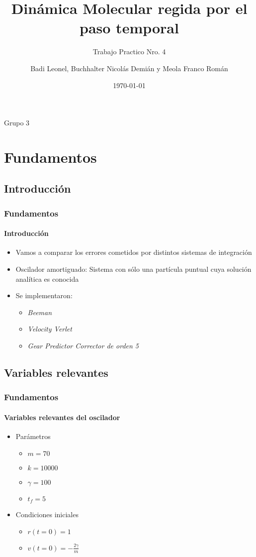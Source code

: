 \documentclass[hyperref={pdfpagelayout=SinglePage}]{beamer}
\title{Dinámica Molecular regida por el paso temporal}
\subtitle{Trabajo Practico Nro. 4}
\author{Badi Leonel, Buchhalter Nicolás Demián y Meola Franco Román}
\date{\today}
\begin{document}
\renewcommand{\figurename}{Grafico}

\begin{frame}[plain]
    \frametitle{} 
    \titlepage
    \centering
	Grupo 3
\end{frame}

\section{Fundamentos}

\subsection{Introducción}

\begin{frame}
\frametitle{Fundamentos}
\framesubtitle{Introducción}
\begin{itemize}
	\item Vamos a comparar los errores cometidos por distintos sistemas de integración
	\item Oscilador amortiguado: Sistema con sólo una partícula puntual cuya solución analítica es conocida
	\item Se implementaron:
	\begin{itemize}
		\item \textit{Beeman}
		\item \textit{Velocity Verlet}
		\item \textit{Gear Predictor Corrector de orden 5}
	\end{itemize}
\end{itemize}
\end{frame}

\subsection{Variables relevantes}

\begin{frame}
\frametitle{Fundamentos}
\framesubtitle{Variables relevantes del oscilador}
\begin{itemize}
\item Parámetros
	\begin{itemize}
		\item $m = 70$
		\item $k = 10000$
		\item $\gamma = 100$
		\item $t_{f} = 5$ 
	\end{itemize}
\item Condiciones iniciales
	\begin{itemize}
		\item $r(t=0) = 1$
		\item $v(t=0) = -\frac{2\gamma}{m}$
	\end{itemize}
\end{itemize}
\end{frame}
\end{document}
